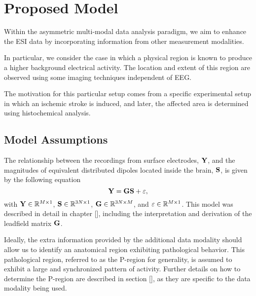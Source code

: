 \chapter{Proposed Model}
%
%
%

Within the asymmetric multi-modal data analysis paradigm, we aim to enhance the ESI data by incorporating information from other measurement modalities.

In particular, we consider the case in which a physical region is known to produce a higher background electrical activity.
%
The location and extent of this region are observed using some imaging techniques independent of EEG.

The motivation for this particular setup comes from a specific experimental setup in which an ischemic stroke is induced, and later, the affected area is determined using histochemical analysis.

\section{Model Assumptions}

The relationship between the recordings from surface electrodes, $\mathbf{Y}$, and the magnitudes of equivalent distributed dipoles located inside the brain, $\mathbf{S}$, is given by the following equation
\begin{equation}
\mathbf{Y} = \mathbf{G} \mathbf{S} + \varepsilon,
\end{equation}
with $\mathbf{Y} \in \mathbb{R}^{M \times 1}$, $\mathbf{S} \in \mathbb{R}^{3N \times 1}$, $\mathbf{G} \in \mathbb{R}^{3N\times M}$, and $\varepsilon\in \mathbb{R}^{M\times 1}$.
%
This model was described in detail in chapter [], including the interpretation and derivation of the leadfield matrix $\mathbf{G}$.

Ideally, the extra information provided by the additional data modality should allow us to identify an anatomical region exhibiting pathological behavior. 
%
This pathological region, referred to as the P-region for generality, is assumed to exhibit a large and synchronized pattern of activity.
%
Further details on how to determine the P-region are described in section [], as they are specific to the data modality being used.

